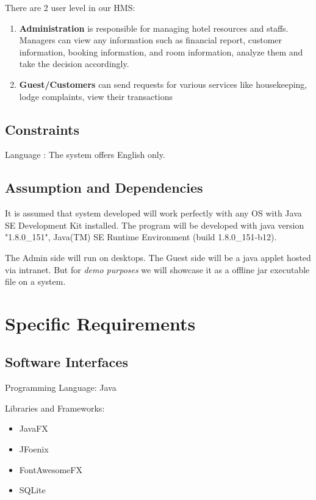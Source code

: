 \documentclass{scrreprt}
\begin{document}
There are 2 user level in our HMS:
\begin{enumerate}
\item \textbf{Administration} is responsible for managing hotel
resources and staffs. Managers can view any information such as financial report, customer information,
booking information, and room information, analyze them and take the decision accordingly.
\item \textbf{Guest/Customers} can send requests for various services like housekeeping, lodge complaints, view their transactions
\end{enumerate}





\section{Constraints}
Language : The system offers English only.

\section{Assumption and Dependencies}
It is assumed that system developed will work perfectly with any OS with Java SE Development Kit installed. The program will be developed with java version "1.8.0_151", 
Java(TM) SE Runtime Environment (build 1.8.0_151-b12).

The Admin side will run on desktops.
The Guest side will be a java applet hosted via intranet. But for \textit{demo purposes} we will showcase it as a offline jar executable file on a system.


\chapter{Specific Requirements}

\section{Software Interfaces}

Programming Language: Java

Libraries and Frameworks:
\begin{itemize}
\item JavaFX 
\item JFoenix
\item FontAwesomeFX
\item SQLite
\end{itemize}
\end{document}
